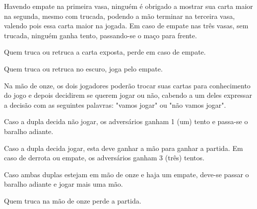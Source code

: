 \begin{article}
	Havendo empate na primeira vasa, ninguém é obrigado a mostrar sua carta maior na segunda, mesmo com trucada, podendo a mão terminar na terceira vasa, valendo pois essa carta maior na jogada. Em caso de empate nas três vasas, sem trucada, ninguém ganha tento, passando-se o maço para frente.

	\begin{xparagraph}
		Quem truca ou retruca a carta exposta, perde em caso de empate.
	\end{xparagraph}

	\begin{xparagraph}
		Quem truca ou retruca no escuro, joga pelo empate.
	\end{xparagraph}
\end{article}

\begin{article}
	Na mão de onze, os dois jogadores poderão trocar suas cartas para conhecimento do jogo e depois decidirem se querem jogar ou não, cabendo a um deles expressar a decisão com as seguintes palavras: "vamos jogar" ou "não vamos jogar".

	\begin{xparagraph}
		Caso a dupla decida não jogar, os adversários ganham 1 (um) tento e passa-se o baralho adiante.
	\end{xparagraph}

	\begin{xparagraph}
		Caso a dupla decida jogar, esta deve ganhar a mão para ganhar a partida. Em caso de derrota ou empate, os adversários ganham 3 (três) tentos.
	\end{xparagraph}

	\begin{xparagraph}
		Caso ambas duplas estejam em mão de onze e haja um empate, deve-se passar o baralho adiante e jogar mais uma mão.
	\end{xparagraph}

	\begin{xparagraph}
		Quem truca na mão de onze perde a partida.
	\end{xparagraph}
\end{article}
